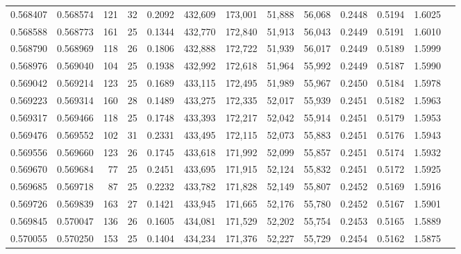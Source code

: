 \begin{tabular}{rrrrrrrrrrrrr}
0.568407 & 0.568574 &   121 &  32 &                                     0.2092 & 432,609 & 173,001 &  51,888 &  56,068 & 0.2448 & 0.5194 & 1.6025 \\
0.568588 & 0.568773 &   161 &  25 &                                     0.1344 & 432,770 & 172,840 &  51,913 &  56,043 & 0.2449 & 0.5191 & 1.6010 \\
0.568790 & 0.568969 &   118 &  26 &                                     0.1806 & 432,888 & 172,722 &  51,939 &  56,017 & 0.2449 & 0.5189 & 1.5999 \\
0.568976 & 0.569040 &   104 &  25 &                                     0.1938 & 432,992 & 172,618 &  51,964 &  55,992 & 0.2449 & 0.5187 & 1.5990 \\
0.569042 & 0.569214 &   123 &  25 &                                     0.1689 & 433,115 & 172,495 &  51,989 &  55,967 & 0.2450 & 0.5184 & 1.5978 \\
0.569223 & 0.569314 &   160 &  28 &                                     0.1489 & 433,275 & 172,335 &  52,017 &  55,939 & 0.2451 & 0.5182 & 1.5963 \\
0.569317 & 0.569466 &   118 &  25 &                                     0.1748 & 433,393 & 172,217 &  52,042 &  55,914 & 0.2451 & 0.5179 & 1.5953 \\
0.569476 & 0.569552 &   102 &  31 &                                     0.2331 & 433,495 & 172,115 &  52,073 &  55,883 & 0.2451 & 0.5176 & 1.5943 \\
0.569556 & 0.569660 &   123 &  26 &                                     0.1745 & 433,618 & 171,992 &  52,099 &  55,857 & 0.2451 & 0.5174 & 1.5932 \\
0.569670 & 0.569684 &    77 &  25 &                                     0.2451 & 433,695 & 171,915 &  52,124 &  55,832 & 0.2451 & 0.5172 & 1.5925 \\
0.569685 & 0.569718 &    87 &  25 &                                     0.2232 & 433,782 & 171,828 &  52,149 &  55,807 & 0.2452 & 0.5169 & 1.5916 \\
0.569726 & 0.569839 &   163 &  27 &                                     0.1421 & 433,945 & 171,665 &  52,176 &  55,780 & 0.2452 & 0.5167 & 1.5901 \\
0.569845 & 0.570047 &   136 &  26 &                                     0.1605 & 434,081 & 171,529 &  52,202 &  55,754 & 0.2453 & 0.5165 & 1.5889 \\
0.570055 & 0.570250 &   153 &  25 &                                     0.1404 & 434,234 & 171,376 &  52,227 &  55,729 & 0.2454 & 0.5162 & 1.5875 \\

\end{tabular}

